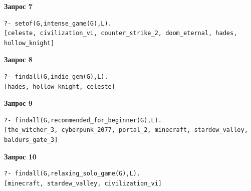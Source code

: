 \noindent\begin{minipage}{\linewidth}
\textbf{Запрос 7}
\begin{lstlisting}
?- setof(G,intense_game(G),L).
[celeste, civilization_vi, counter_strike_2, doom_eternal, hades,
hollow_knight]
\end{lstlisting}
\end{minipage}\par\smallskip

\noindent\begin{minipage}{\linewidth}
\textbf{Запрос 8}
\begin{lstlisting}
?- findall(G,indie_gem(G),L).
[hades, hollow_knight, celeste]
\end{lstlisting}
\end{minipage}\par\smallskip

\noindent\begin{minipage}{\linewidth}
\textbf{Запрос 9}
\begin{lstlisting}
?- findall(G,recommended_for_beginner(G),L).
[the_witcher_3, cyberpunk_2077, portal_2, minecraft, stardew_valley,
baldurs_gate_3]
\end{lstlisting}
\end{minipage}\par\smallskip

\noindent\begin{minipage}{\linewidth}
\textbf{Запрос 10}
\begin{lstlisting}
?- findall(G,relaxing_solo_game(G),L).
[minecraft, stardew_valley, civilization_vi]
\end{lstlisting}
\end{minipage}\par\smallskip
